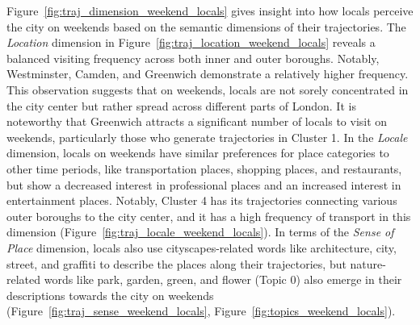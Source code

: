 \documentclass{article}
\theoremstyle{remark}
\begin{document}
Figure~\ref{fig:traj_dimension_weekend_locals} gives insight into how locals perceive the city on weekends based on the semantic dimensions of their trajectories. The \textit{Location} dimension in Figure~\ref{fig:traj_location_weekend_locals} reveals a balanced visiting frequency across both inner and outer boroughs. Notably, Westminster, Camden, and Greenwich demonstrate a relatively higher frequency. This observation suggests that on weekends, locals are not sorely concentrated in the city center but rather spread across different parts of London. It is noteworthy that Greenwich attracts a significant number of locals to visit on weekends, particularly those who generate trajectories in Cluster 1. In the \textit{Locale} dimension, locals on weekends have similar preferences for place categories to other time periods, like transportation places, shopping places, and restaurants, but show a decreased interest in professional places and an increased interest in entertainment places. Notably, Cluster 4 has its trajectories connecting various outer boroughs to the city center, and it has a high frequency of transport in this dimension (Figure~\ref{fig:traj_locale_weekend_locals}). In terms of the \textit{Sense of Place} dimension, locals also use cityscapes-related words like architecture, city, street, and graffiti to describe the places along their trajectories, but nature-related words like park, garden, green, and flower (Topic 0) also emerge in their descriptions towards the city on weekends (Figure~\ref{fig:traj_sense_weekend_locals}, Figure~\ref{fig:topics_weekend_locals}).
\end{document}
